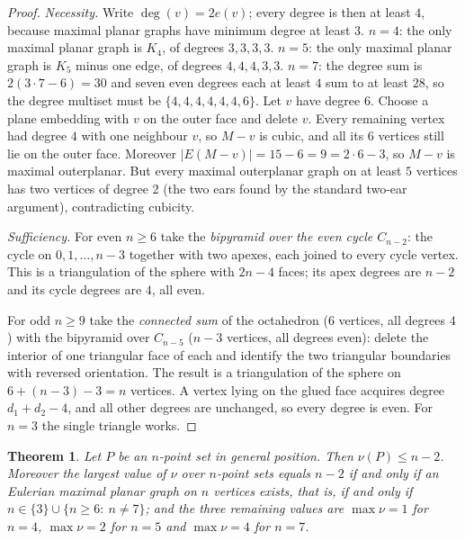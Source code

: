\documentclass[11pt]{article}
\theoremstyle{plain}
\newtheorem{theorem}{Theorem}[section]
\theoremstyle{definition}
\theoremstyle{remark}
\begin{document}
\begin{proof}
\emph{Necessity.} Write $\deg(v)=2e(v)$; every degree is then at least $4$, because maximal
planar graphs have minimum degree at least $3$.
\emph{$n=4$}: the only maximal planar graph is $K_4$, of degrees $3,3,3,3$.
\emph{$n=5$}: the only maximal planar graph is $K_5$ minus one edge, of degrees
$4,4,4,3,3$.
\emph{$n=7$}: the degree sum is $2(3\cdot 7-6)=30$ and seven even degrees each at least $4$
sum to at least $28$, so the degree multiset must be $\{4,4,4,4,4,4,6\}$.  Let $v$ have
degree $6$.  Choose a plane embedding with $v$ on the outer face and delete $v$.  Every
remaining vertex had degree $4$ with one neighbour $v$, so $M-v$ is cubic, and all its $6$
vertices still lie on the outer face.  Moreover $|E(M-v)|=15-6=9=2\cdot 6-3$, so $M-v$ is
maximal outerplanar.  But every maximal outerplanar graph on at least $5$ vertices has two
vertices of degree $2$ (the two ears found by the standard two-ear argument), contradicting
cubicity.

\emph{Sufficiency.} For even $n\ge 6$ take the \emph{bipyramid over the even cycle
$C_{n-2}$}: the cycle on $0,1,\dots,n-3$ together with two apexes, each joined to every
cycle vertex.  This is a triangulation of the sphere with $2n-4$ faces; its apex degrees are
$n-2$ and its cycle degrees are $4$, all even.

For odd $n\ge 9$ take the \emph{connected sum} of the octahedron ($6$ vertices, all degrees
$4$) with the bipyramid over $C_{n-5}$ ($n-3$ vertices, all degrees even): delete the
interior of one triangular face of each and identify the two triangular boundaries with
reversed orientation.  The result is a triangulation of the sphere on
$6+(n-3)-3=n$ vertices.  A vertex lying on the glued face acquires degree $d_1+d_2-4$, and
all other degrees are unchanged, so every degree is even.  For $n=3$ the single triangle
works.
\end{proof}

\begin{theorem}\label{thm:general}
Let $P$ be an $n$-point set in general position.  Then $\nu(P)\le n-2$.  Moreover the
largest value of $\nu$ over $n$-point sets equals $n-2$ if and only if an Eulerian maximal
planar graph on $n$ vertices exists, that is, if and only if
$n\in\{3\}\cup\{n\ge 6:\ n\ne 7\}$; and the three remaining values are
$\max\nu=1$ for $n=4$, $\max\nu=2$ for $n=5$ and $\max\nu=4$ for $n=7$.
\end{theorem}
\end{document}
